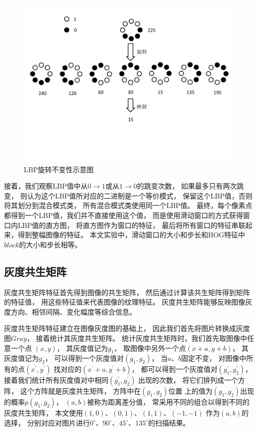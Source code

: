 \begin{figure}[htbp]
\centering
\includegraphics[width=0.8\linewidth]{figures/lbp2.pdf}
\caption{LBP旋转不变性示意图}
\label{fig:lbp2}
\end{figure}

接着，我们观察LBP值中从$0\rightarrow 1$或从$1\rightarrow 0$的跳变次数，
如果最多只有两次跳变，
则认为这个LBP值所对应的二进制是一个等价模式，
保留这个LBP值，否则将其划分到混合模式类，
所有混合模式类使用同一个LBP值。
最终，每个像素点都得到一个LBP值，我们并不直接使用这个值，
而是使用滑动窗口的方式获得窗口内LBP值的直方图，
将直方图作为窗口的特征，
最后将所有窗口的特征串联起来，得到整幅图像的特征。
本文实验中，滑动窗口的大小和步长和HOG特征中$block$的大小和步长相等。

\subsection{灰度共生矩阵}

灰度共生矩阵特征首先得到图像的共生矩阵，
然后通过计算该共生矩阵得到矩阵的特征值，
用这些特征值来代表图像的纹理特征。
灰度共生矩阵能够反映图像灰度方向、相邻间隔、变化幅度等综合信息。

灰度共生矩阵特征建立在图像灰度图的基础上，
因此我们首先将图片转换成灰度图$Gray$，
接着统计其灰度共生矩阵。
统计灰度共生矩阵时，我们首先取图像中任意一个点
$(x,y)$，
其灰度值记为${g}_{1}$，
取图像中另外一个点$(x+a,y+b)$，
其灰度值记为${g}_{2}$，
可以得到一个灰度值对$({g}_{1},{g}_{2})$，
当$a$、$b$固定不变，
对图像中所有的点$({x}^{'},{y}^{'})$
找对应的$({x}^{'}+a,{y}^{'}+b)$，
都可以得到一个灰度值对$({g}_{1}^{'},{g}_{2}^{'})$，
接着我们统计所有灰度值对中相同$({g}_{1}^{'},{g}_{2}^{'})$
出现的次数，
将它们排列成一个方阵，
这个方阵就是灰度共生矩阵，
方阵中在$({g}_{1},{g}_{2})$位置
上的值为$({g}_{1},{g}_{2})$出现的概率$p({g}_{1},{g}_{2})$，
$(a,b)$被称为距离差分值，
常采用不同的组合以得到不同的灰度共生矩阵，
本文使用$(1,0)$、$(0,1)$、$(1,1)$、$(-1,-1)$
作为$(a,b)$的选择，
分别对应对图片进行${0}^{\circ}$、${90}^{\circ}$、${45}^{\circ}$、${135}^{\circ}$的扫描结果。

